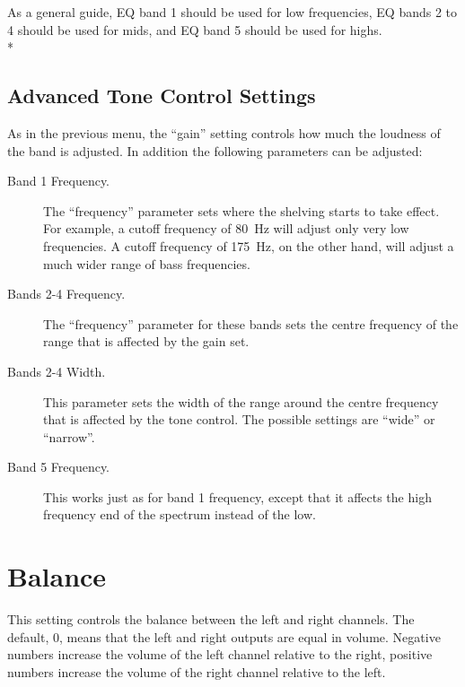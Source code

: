 {  As a general guide, EQ band 1 should be used for low frequencies, EQ bands 2
  to 4 should be used for mids, and EQ band 5 should be used for highs.\\*

  \subsection{Advanced Tone Control Settings}
    As in the previous menu, the ``gain'' setting controls how much the
    loudness of the band is adjusted.  In addition the following parameters
    can be adjusted:  

  \begin{description}
    \item[Band 1 Frequency.]
        The ``frequency'' parameter sets where the shelving starts to take
        effect. For example, a cutoff frequency of 80~Hz will adjust only very
        low frequencies. A cutoff frequency of 175~Hz, on the other hand, will
        adjust a much wider range of bass frequencies.
  \item[Bands 2-4 Frequency.]
        The ``frequency'' parameter for these bands sets the centre frequency of
        the range that is affected by the gain set.
  \item[Bands 2-4 Width.]
        This parameter sets the width of the range around the centre frequency
        that is affected by the tone control. The possible settings are
        ``wide'' or ``narrow''.
  \item[Band 5 Frequency.]
        This works just as for band 1 frequency, except that it affects the
        high frequency end of the spectrum instead of the low.
  \end{description}

}

\section{Balance}
  This setting controls the balance between the left and right channels. The
  default, 0, means that the left and right outputs are equal in volume.
  Negative numbers increase the volume of the left channel relative to the
  right, positive numbers increase the volume of the right channel relative
  to the left.

